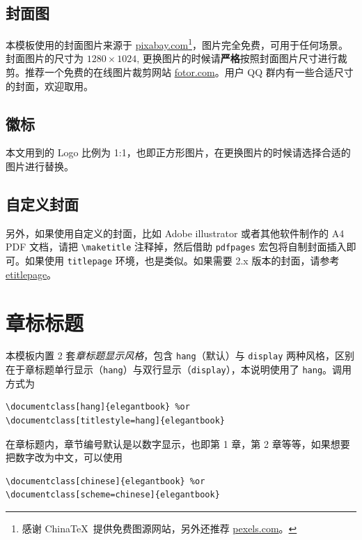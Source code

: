 \documentclass[lang=cn,newtx,10pt,scheme=chinese]{elegantbook}
\begin{document}
\subsection{封面图}

本模板使用的封面图片来源于 \href{https://pixabay.com/en/tea-time-poetry-coffee-reading-3240766/}{pixabay.com}\footnote{感谢 China\TeX\ 提供免费图源网站，另外还推荐 \href{https://www.pexels.com/}{pexels.com}。}，图片完全免费，可用于任何场景。封面图片的尺寸为 $1280 \times 1024$, 更换图片的时候请\textbf{严格}按照封面图片尺寸进行裁剪。推荐一个免费的在线图片裁剪网站 \href{https://www.fotor.com/cn}{fotor.com}。用户 QQ 群内有一些合适尺寸的封面，欢迎取用。

\subsection{徽标}

本文用到的 Logo 比例为 1:1，也即正方形图片，在更换图片的时候请选择合适的图片进行替换。

\subsection{自定义封面}

另外，如果使用自定义的封面，比如 Adobe illustrator 或者其他软件制作的 A4 PDF 文档，请把 \lstinline{\maketitle} 注释掉，然后借助 \lstinline{pdfpages} 宏包将自制封面插入即可。如果使用 \lstinline{titlepage} 环境，也是类似。如果需要 2.x 版本的封面，请参考 \href{https://github.com/EthanDeng/etitlepage}{etitlepage}。

\section{章标标题}

本模板内置 2 套\textit{章标题显示风格}，包含 \lstinline{hang}（默认）与 \lstinline{display} 两种风格，区别在于章标题单行显示（\lstinline{hang}）与双行显示（\lstinline{display}），本说明使用了 \lstinline{hang}。调用方式为
\begin{lstlisting}
\documentclass[hang]{elegantbook} %or
\documentclass[titlestyle=hang]{elegantbook}
\end{lstlisting}

在章标题内，章节编号默认是以数字显示，也即{\kaishu 第 1 章}，{\kaishu 第 2 章}等等，如果想要把数字改为中文，可以使用
\begin{lstlisting}
\documentclass[chinese]{elegantbook} %or
\documentclass[scheme=chinese]{elegantbook}
\end{lstlisting}
\end{document}
